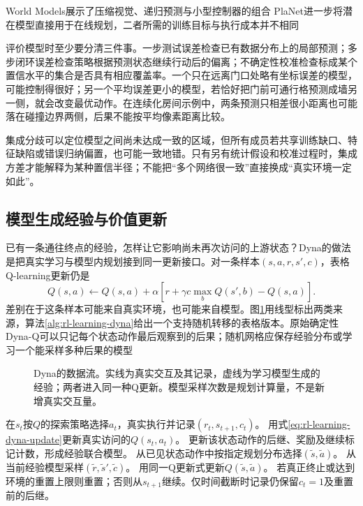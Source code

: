 World Models展示了压缩视觉、递归预测与小型控制器的组合
PlaNet进一步将潜在模型直接用于在线规划，二者所需的训练目标与执行成本并不相同

评价模型时至少要分清三件事。一步测试误差检查已有数据分布上的局部预测；多步闭环误差检查策略根据预测状态继续行动后的偏离；不确定性校准检查标成某个置信水平的集合是否具有相应覆盖率。一个只在远离门口处略有坐标误差的模型，可能控制得很好；另一个平均误差更小的模型，若恰好把门前可通行格预测成墙另一侧，就会改变最优动作。在连续化房间示例中，两条预测只相差很小距离也可能落在碰撞边界两侧，后果不能按平均像素距离比较。

集成分歧可以定位模型之间尚未达成一致的区域，但所有成员若共享训练缺口、特征缺陷或错误归纳偏置，也可能一致地错。只有另有统计假设和校准过程时，集成方差才能解释为某种置信半径；不能把“多个网络很一致”直接换成“真实环境一定如此”。

\subsection{模型生成经验与价值更新}
\label{sec:rl-learning-dyna}

已有一条通往终点的经验，怎样让它影响尚未再次访问的上游状态？Dyna的做法是把真实学习与模型内规划接到同一更新接口。对一条样本$(s,a,r,s',c)$，表格Q-learning更新仍是
\begin{equation}
  Q(s,a)\gets Q(s,a)+\alpha
  \left[r+\gamma c\max_bQ(s',b)-Q(s,a)\right].
  \label{eq:rl-learning-dyna-update}
\end{equation}
差别在于这条样本可能来自真实环境，也可能来自模型。图\ref{fig:rl-learning-dyna}用线型标出两类来源，算法\ref{alg:rl-learning-dyna}给出一个支持随机转移的表格版本。原始确定性Dyna-Q可以只记每个状态动作最后观察到的后果；随机网格应保存经验分布或学习一个能采样多种后果的模型

\begin{figure}[t]
  \centering
  
  \caption{Dyna的数据流。实线为真实交互及其记录，虚线为学习模型生成的经验；两者进入同一种Q更新。模型采样次数是规划计算量，不是新增真实交互量。}
  \label{fig:rl-learning-dyna}
\end{figure}

\begin{algorithm}[随机表格Dyna的一轮交互]
  \label{alg:rl-learning-dyna}
  \begin{algorithmic}[1]
    \State 在$s_t$按$Q$的探索策略选择$a_t$，真实执行并记录$(r_t,s_{t+1},c_t)$。
    \State 用式\eqref{eq:rl-learning-dyna-update}更新真实访问的$Q(s_t,a_t)$。
    \State 更新该状态动作的后继、奖励及继续标记计数，形成经验联合模型。
      \State 从已见状态动作中按指定规划分布选择$(\widetilde s,\widetilde a)$。
      \State 从当前经验模型采样$(\widetilde r,\widetilde s',\widetilde c)$。
      \State 用同一Q更新式更新$Q(\widetilde s,\widetilde a)$。
    \EndFor
    \State 若真正终止或达到环境的重置上限则重置；否则从$s_{t+1}$继续。仅时间截断时记录仍保留$c_t=1$及重置前的后继。
  \end{algorithmic}
\end{algorithm}

